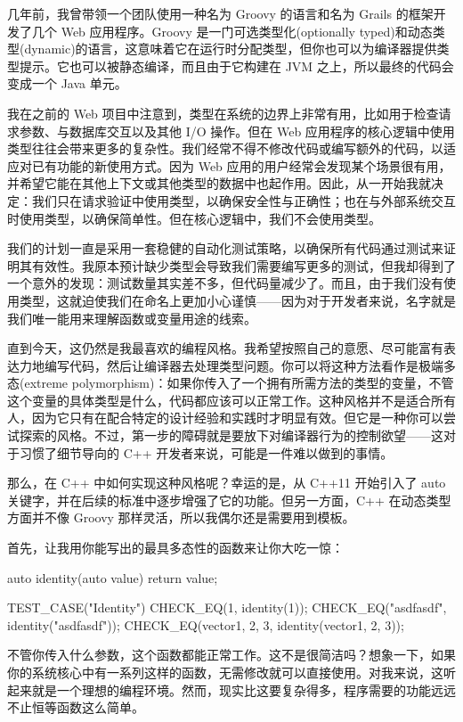 
几年前，我曾带领一个团队使用一种名为 Groovy 的语言和名为 Grails 的框架开发了几个 Web 应用程序。Groovy 是一门可选类型化(optionally typed)和动态类型(dynamic)的语言，这意味着它在运行时分配类型，但你也可以为编译器提供类型提示。它也可以被静态编译，而且由于它构建在 JVM 之上，所以最终的代码会变成一个 Java 单元。

我在之前的 Web 项目中注意到，类型在系统的边界上非常有用，比如用于检查请求参数、与数据库交互以及其他 I/O 操作。但在 Web 应用程序的核心逻辑中使用类型往往会带来更多的复杂性。我们经常不得不修改代码或编写额外的代码，以适应对已有功能的新使用方式。因为 Web 应用的用户经常会发现某个场景很有用，并希望它能在其他上下文或其他类型的数据中也起作用。因此，从一开始我就决定：我们只在请求验证中使用类型，以确保安全性与正确性；也在与外部系统交互时使用类型，以确保简单性。但在核心逻辑中，我们不会使用类型。

我们的计划一直是采用一套稳健的自动化测试策略，以确保所有代码通过测试来证明其有效性。我原本预计缺少类型会导致我们需要编写更多的测试，但我却得到了一个意外的发现：测试数量其实差不多，但代码量减少了。而且，由于我们没有使用类型，这就迫使我们在命名上更加小心谨慎——因为对于开发者来说，名字就是我们唯一能用来理解函数或变量用途的线索。

直到今天，这仍然是我最喜欢的编程风格。我希望按照自己的意愿、尽可能富有表达力地编写代码，然后让编译器去处理类型问题。你可以将这种方法看作是极端多态(extreme polymorphism)：如果你传入了一个拥有所需方法的类型的变量，不管这个变量的具体类型是什么，代码都应该可以正常工作。这种风格并不是适合所有人，因为它只有在配合特定的设计经验和实践时才明显有效。但它是一种你可以尝试探索的风格。不过，第一步的障碍就是要放下对编译器行为的控制欲望——这对于习惯了细节导向的 C++ 开发者来说，可能是一件难以做到的事情。

那么，在 C++ 中如何实现这种风格呢？幸运的是，从 C++11 开始引入了 auto 关键字，并在后续的标准中逐步增强了它的功能。但另一方面，C++ 在动态类型方面并不像 Groovy 那样灵活，所以我偶尔还是需要用到模板。

首先，让我用你能写出的最具多态性的函数来让你大吃一惊：

\begin{cpp}
auto identity(auto value){ return value;}

TEST_CASE("Identity"){
  CHECK_EQ(1, identity(1));
  CHECK_EQ("asdfasdf", identity("asdfasdf"));
  CHECK_EQ(vector{1, 2, 3}, identity(vector{1, 2, 3}));
}
\end{cpp}

不管你传入什么参数，这个函数都能正常工作。这不是很简洁吗？想象一下，如果你的系统核心中有一系列这样的函数，无需修改就可以直接使用。对我来说，这听起来就是一个理想的编程环境。然而，现实比这要复杂得多，程序需要的功能远远不止恒等函数这么简单。

